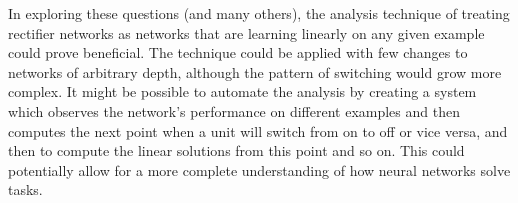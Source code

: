 \documentclass[11pt]{article}
\begin{document}
In exploring these questions (and many others), the analysis technique of treating rectifier networks as networks that are learning linearly on any given example could prove beneficial. The technique could be applied with few changes to networks of arbitrary depth, although the pattern of switching would grow more complex. It might be possible to automate the analysis by creating a system which observes the network's performance on different examples and then computes the next point when a unit will switch from on to off or vice versa, and then to compute the linear solutions from this point and so on. This could potentially allow for a more complete understanding of how neural networks solve tasks.\par 


\end{document}
